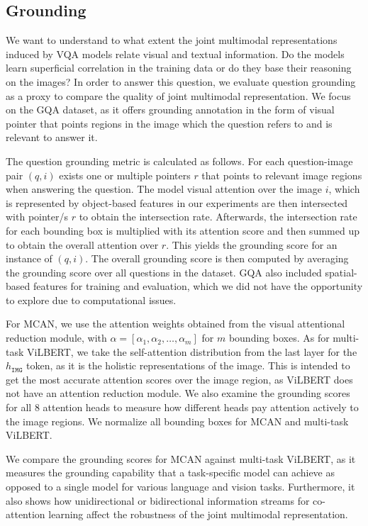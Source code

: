 \documentclass{article}
\begin{document}
\subsection{Grounding}
We want to understand to what extent the joint multimodal representations induced by VQA models relate visual and textual information. Do the models learn superficial correlation in the training data or do they base their reasoning on the images? In order to answer this question, we evaluate question grounding as a proxy to compare the quality of joint multimodal representation. We focus on the GQA dataset, as it offers grounding annotation in the form of visual pointer that points regions in the image which the question refers to and is relevant to answer it. 

The question grounding metric is calculated as follows. For each question-image pair $(q, i)$ exists one or multiple pointers $r$ that points to relevant image regions when answering the question. The model visual attention over the image $i$, which is represented by object-based features in our experiments are then intersected with pointer/s $r$ to obtain the intersection rate. Afterwards, the intersection rate for each bounding box is multiplied with its attention score and then summed up to obtain the overall attention over $r$. This yields the grounding score for an instance of $(q, i)$. The overall grounding score is then computed by averaging the grounding score over all questions in the dataset. GQA also included spatial-based features for training and evaluation, which we did not have the opportunity to explore due to computational issues.

For MCAN, we use the attention weights obtained from the visual attentional reduction module, with $\alpha = [\alpha_{1}, \alpha_{2}, \dots, \alpha_{m}]$ for $m$ bounding boxes. As for multi-task ViLBERT, we take the self-attention distribution from the last layer for the $h_{\mathtt{IMG}}$ token, as it is the holistic representations of the image. This is intended to get the most accurate attention scores over the image region, as ViLBERT does not have an attention reduction module. We also examine the grounding scores for all 8 attention heads to measure how different heads pay attention actively to the image regions. We normalize all bounding boxes for MCAN and multi-task ViLBERT.

We compare the grounding scores for MCAN against multi-task ViLBERT, as it measures the grounding capability that a task-specific model can achieve as opposed to a single model for various language and vision tasks. Furthermore, it also shows how unidirectional or bidirectional information streams for co-attention learning affect the robustness of the joint multimodal representation.
\end{document}
